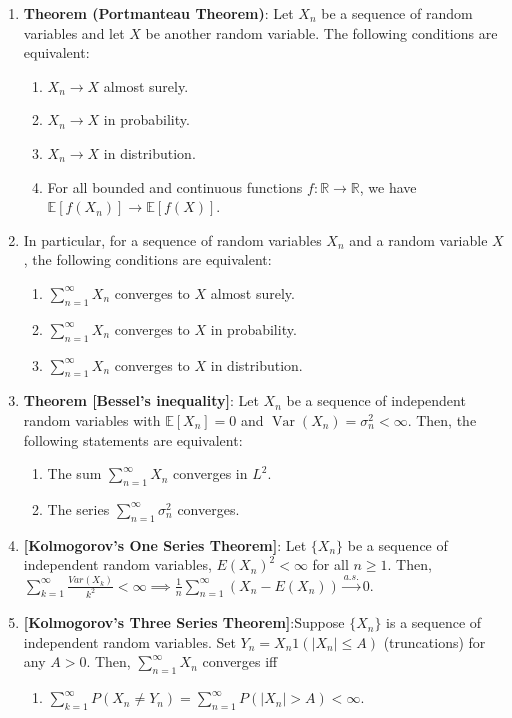 \documentclass[12pt,oneside]{book}
\begin{document}
\begin{enumerate}
\item \textbf{Theorem (Portmanteau Theorem)}: Let ${X_n}$ be a sequence of random variables and let $X$ be another random variable. The following conditions are equivalent:
\begin{enumerate}
\item $X_n \rightarrow X$ almost surely.
\item $X_n \rightarrow X$ in probability.
\item $X_n \rightarrow X$ in distribution.
\item For all bounded and continuous functions $f: \mathbb{R} \rightarrow \mathbb{R}$, we have $\mathbb{E}[f(X_n)] \rightarrow \mathbb{E}[f(X)]$.
\end{enumerate}
\item In particular, for a sequence of random variables ${X_n}$ and a random variable $X$, the following conditions are equivalent:
\begin{enumerate}
\item $\sum_{n=1}^{\infty} X_n$ converges to $X$ almost surely.
\item $\sum_{n=1}^{\infty} X_n$ converges to $X$ in probability.
\item $\sum_{n=1}^{\infty} X_n$ converges to $X$ in distribution.
\end{enumerate}
\item \textbf{Theorem [Bessel's inequality]}: Let ${X_n}$ be a sequence of independent random variables with $\mathbb{E}[X_n] = 0$ and $\operatorname{Var}(X_n) = \sigma_n^2 < \infty$. Then, the following statements are equivalent:
\begin{enumerate}
\item The sum $\sum_{n=1}^\infty X_n$ converges in $L^2$.
\item The series $\sum_{n=1}^\infty \sigma_n^2$ converges.
\end{enumerate}
\item \textbf{[Kolmogorov's One Series Theorem]}: Let $\{X_n\}$ be a sequence of independent random variables, $E(X_n)^2<\infty$ for all $n\geq 1$. Then, $\sum_{k=1}^\infty \frac{Var(X_k)}{k^2}<\infty \implies \frac{1}{n}\sum_{n=1}^\infty(X_n-E(X_n))\xrightarrow[]{a.s.}0$.
\item \textbf{[Kolmogorov's Three Series Theorem]}:Suppose $\{X_n\}$ is a sequence of independent random variables. Set $Y_n=X_n1(|X_n|\leq A)$ (truncations) for any $A>0$. Then, $\sum_{n=1}^\infty X_n$ converges iff
\begin{enumerate}
    \item $\sum_{k=1}^\infty P(X_n\neq Y_n)=\sum_{n=1}^\infty P(|X_n|>A)<\infty$.

\end{enumerate}
\end{enumerate}
\end{document}
